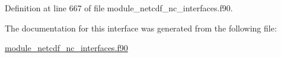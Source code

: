 Definition at line 667 of file module\+\_\+netcdf\+\_\+nc\+\_\+interfaces.\+f90.



The documentation for this interface was generated from the following file\+:\begin{DoxyCompactItemize}
\item 
\hyperlink{module__netcdf__nc__interfaces_8f90}{module\+\_\+netcdf\+\_\+nc\+\_\+interfaces.\+f90}\end{DoxyCompactItemize}
